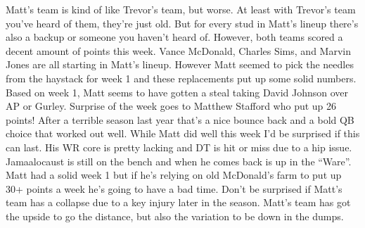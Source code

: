 \documentclass[11pt,letterpaper]{article}
\begin{document}
\bigskip 
\par\noindent Matt's team is kind of like Trevor's team, but worse. At least with Trevor's team you've heard of them, they're just old. But for every stud in Matt's lineup there's also a backup or someone you haven't heard of. However, both teams scored a decent amount of points this week. Vance McDonald, Charles Sims, and Marvin Jones are all starting in Matt's lineup. However Matt seemed to pick the needles from the haystack for week 1 and these replacements put up some solid numbers. Based on week 1, Matt seems to have gotten a steal taking David Johnson over AP or Gurley. Surprise of the week goes to Matthew Stafford who put up 26 points! After a terrible season last year that's a nice bounce back and a bold QB choice that worked out well. While Matt did well this week I'd be surprised if this can last. His WR core is pretty lacking and DT is hit or miss due to a hip issue. Jamaalocaust is still on the bench and when he comes back is up in the ``Ware''.  Matt had a solid week 1 but if he's relying on old McDonald's farm to put up 30+ points a week he's going to have a bad time. Don't be surprised if Matt's team has a collapse due to a key injury later in the season. Matt's team has got the upside to go the distance, but also the variation to be down in the dumps.
\end{document}
